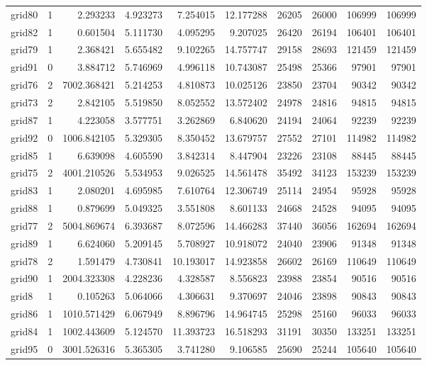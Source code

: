 \begin{longtable}{|l|r|r|r|r|r|r|r|r|r|}
grid80 & 1 & 2.293233 & 4.923273 & 7.254015 & 12.177288 & 26205 & 26000 & 106999 & 106999 \\
grid82 & 1 & 0.601504 & 5.111730 & 4.095295 & 9.207025 & 26420 & 26194 & 106401 & 106401 \\
grid79 & 1 & 2.368421 & 5.655482 & 9.102265 & 14.757747 & 29158 & 28693 & 121459 & 121459 \\
grid91 & 0 & 3.884712 & 5.746969 & 4.996118 & 10.743087 & 25498 & 25366 & 97901 & 97901 \\
grid76 & 2 & 7002.368421 & 5.214253 & 4.810873 & 10.025126 & 23850 & 23704 & 90342 & 90342 \\
grid73 & 2 & 2.842105 & 5.519850 & 8.052552 & 13.572402 & 24978 & 24816 & 94815 & 94815 \\
grid87 & 1 & 4.223058 & 3.577751 & 3.262869 & 6.840620 & 24194 & 24064 & 92239 & 92239 \\
grid92 & 0 & 1006.842105 & 5.329305 & 8.350452 & 13.679757 & 27552 & 27101 & 114982 & 114982 \\
grid85 & 1 & 6.639098 & 4.605590 & 3.842314 & 8.447904 & 23226 & 23108 & 88445 & 88445 \\
grid75 & 2 & 4001.210526 & 5.534953 & 9.026525 & 14.561478 & 35492 & 34123 & 153239 & 153239 \\
grid83 & 1 & 2.080201 & 4.695985 & 7.610764 & 12.306749 & 25114 & 24954 & 95928 & 95928 \\
grid88 & 1 & 0.879699 & 5.049325 & 3.551808 & 8.601133 & 24668 & 24528 & 94095 & 94095 \\
grid77 & 2 & 5004.869674 & 6.393687 & 8.072596 & 14.466283 & 37440 & 36056 & 162694 & 162694 \\
grid89 & 1 & 6.624060 & 5.209145 & 5.708927 & 10.918072 & 24040 & 23906 & 91348 & 91348 \\
grid78 & 2 & 1.591479 & 4.730841 & 10.193017 & 14.923858 & 26602 & 26169 & 110649 & 110649 \\
grid90 & 1 & 2004.323308 & 4.228236 & 4.328587 & 8.556823 & 23988 & 23854 & 90516 & 90516 \\
grid8 & 1 & 0.105263 & 5.064066 & 4.306631 & 9.370697 & 24046 & 23898 & 90843 & 90843 \\
grid86 & 1 & 1010.571429 & 6.067949 & 8.896796 & 14.964745 & 25298 & 25160 & 96033 & 96033 \\
grid84 & 1 & 1002.443609 & 5.124570 & 11.393723 & 16.518293 & 31191 & 30350 & 133251 & 133251 \\
grid95 & 0 & 3001.526316 & 5.365305 & 3.741280 & 9.106585 & 25690 & 25244 & 105640 & 105640 \\

\end{longtable}
